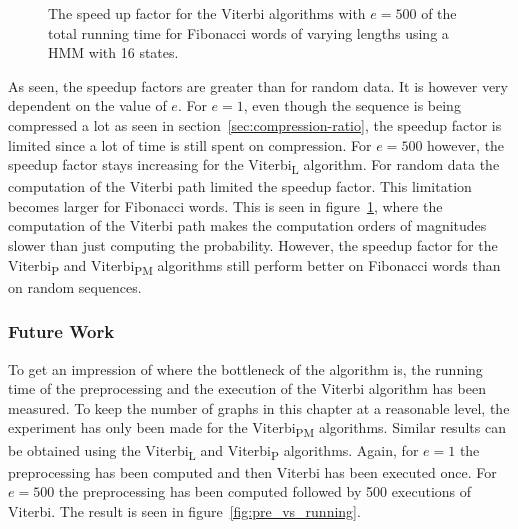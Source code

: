 \begin{figure}
  \centering
  
  \caption{The speed up factor for the Viterbi algorithms with $e = 500$ of the total
    running time for Fibonacci words of varying
    lengths using a HMM with 16 states.}
  \label{fig:fib_compressed_500_speedup_vs_sequence_length}
\end{figure}

As seen, the speedup factors are greater than for random data. It is however
very dependent on the value of $e$. For $e = 1$, even though the sequence is
being compressed a lot as seen in section~\ref{sec:compression-ratio}, the
speedup factor is limited since a lot of time is still spent on compression.
For $e = 500$ however, the speedup factor stays increasing for the
Viterbi\textsubscript{L} algorithm. For random data the computation of the
Viterbi path limited the speedup factor. This limitation becomes larger for
Fibonacci words. This is seen in
figure~\ref{fig:fib_compressed_500_speedup_vs_sequence_length}, where the
computation of the Viterbi path makes the computation orders of magnitudes
slower than just computing the probability. However, the speedup factor for the
Viterbi\textsubscript{P} and Viterbi\textsubscript{PM} algorithms still perform
better on Fibonacci words than on random sequences.

\subsubsection{Future Work}

To get an impression of where the bottleneck of the algorithm is, the running
time of the preprocessing and the execution of the Viterbi algorithm has been
measured. To keep the number of graphs in this chapter at a reasonable level,
the experiment has only been made for the Viterbi\textsubscript{PM} algorithms.
Similar results can be obtained using the Viterbi\textsubscript{L} and
Viterbi\textsubscript{P} algorithms. Again, for $e = 1$ the preprocessing has
been computed and then Viterbi has been executed once. For $e = 500$ the
preprocessing has been computed followed by 500 executions of Viterbi. The
result is seen in figure~\ref{fig:pre_vs_running}.


